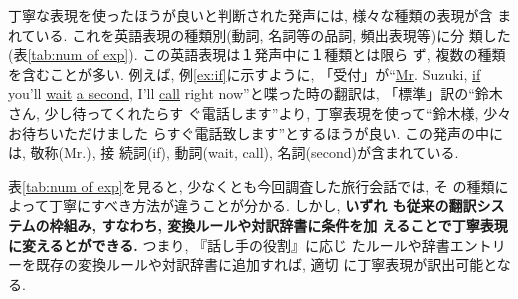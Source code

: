 丁寧な表現を使ったほうが良いと判断された発声には, 様々な種類の表現が含
まれている. これを英語表現の種類別(動詞, 名詞等の品詞, 頻出表現等)に分
類した(表\ref{tab:num of exp}). この英語表現は１発声中に１種類とは限ら
ず, 複数の種類を含むことが多い. 例えば, 例\ref{ex:if}に示すように, 
「受付」が``\underline{Mr}. Suzuki, \underline{if} you'll
\underline{wait} \underline{a second}, I'll \underline{call} right
now''と喋った時の翻訳は, 「標準」訳の``鈴木さん, 少し待ってくれたらす
ぐ電話します''より, 丁寧表現を使って``鈴木様, 少々お待ちいただけました
らすぐ電話致します''とするほうが良い. この発声の中には, 敬称(Mr.), 接
続詞(if), 動詞(wait, call), 名詞(second)が含まれている.

\vspace{3mm}
\begin{center}
\end{center}
\vspace{3mm}

表\ref{tab:num of exp}を見ると, 少なくとも今回調査した旅行会話では, そ
の種類によって丁寧にすべき方法が違うことが分かる. しかし, {\bf いずれ
も従来の翻訳システムの枠組み, すなわち, 変換ルールや対訳辞書に条件を加
えることで丁寧表現に変えるとができる.} つまり, 『話し手の役割』に応じ
たルールや辞書エントリーを既存の変換ルールや対訳辞書に追加すれば, 適切
に丁寧表現が訳出可能となる.

